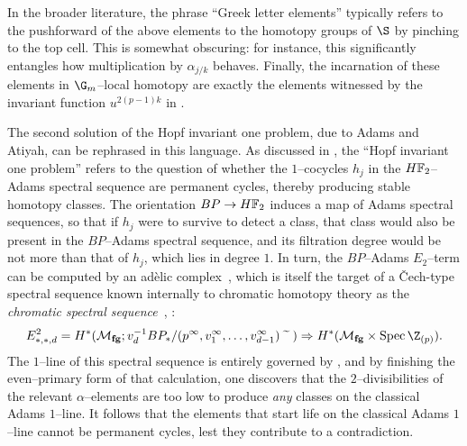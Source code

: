 \begin{remark}\label{GreekLetterElements}
In the broader literature, the phrase ``Greek letter elements'' typically refers to the pushforward of the above elements to the homotopy groups of \(\S\) by pinching to the top cell.  This is somewhat obscuring: for instance, this significantly entangles how multiplication by \(\alpha_{j/k}\) behaves.  Finally, the incarnation of these elements in \(\G_m\)--local homotopy are exactly the elements witnessed by the invariant function \(u^{2(p-1)k}\) in .
\end{remark}

\begin{remark}
The second solution of the Hopf invariant one problem, due to Adams and Atiyah, can be rephrased in this language.  As discussed in , the ``Hopf invariant one problem'' refers to the question of whether the \(1\)--cocycles \(h_j\) in the \(\HFtwo\)--Adams spectral sequence are permanent cycles, thereby producing stable homotopy classes.  The orientation \(BP \to \HFtwo\) induces a map of Adams spectral sequences, so that if \(h_j\) were to survive to detect a class, that class would also be present in the \(BP\)--Adams spectral sequence, and its filtration degree would be not more than that of \(h_j\), which lies in degree \(1\).  In turn, the \(BP\)--Adams \(E_2\)--term can be computed by an ad\`elic complex~\cite{BeilinsonAdeles,Huber}, which is itself the target of a \v{C}ech-type spectral sequence known internally to chromatic homotopy theory as the \textit{chromatic spectral sequence}~\cite[Section 3]{MRW}, \cite[Equation 4.60]{Wilson}: \[E^2_{*,*,d} = H^*(\moduli{fg}; v_d^{-1} BP_* / (p^\infty, v_1^\infty, \ldots, v_{d-1}^\infty)\widetilde{\quad}) \Rightarrow H^*(\moduli{fg} \times \Spec \Z_{(p)}).\]  The \(1\)--line of this spectral sequence is entirely governed by , and by finishing the even--primary form of that calculation, one discovers that the \(2\)--divisibilities of the relevant \(\alpha\)--elements are too low to produce \emph{any} classes on the classical Adams \(1\)--line.  It follows that the elements that start life on the classical Adams \(1\)--line cannot be permanent cycles, lest they contribute to a contradiction.
\end{remark}

